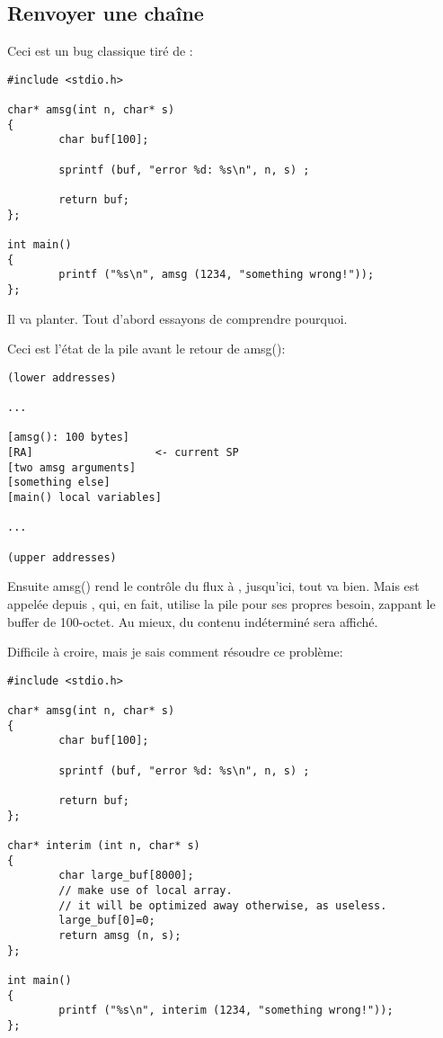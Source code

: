 \subsection{Renvoyer une chaîne}

Ceci est un bug classique tiré de \RobPikePractice{}:

\begin{lstlisting}[style=customc]
#include <stdio.h>

char* amsg(int n, char* s)
{
        char buf[100];

        sprintf (buf, "error %d: %s\n", n, s) ;

        return buf;
};

int main()
{
        printf ("%s\n", amsg (1234, "something wrong!"));
};
\end{lstlisting}

Il va planter.
Tout d'abord essayons de comprendre pourquoi.

Ceci est l'état de la pile avant le retour de amsg():

\begin{lstlisting}
(lower addresses)

...

[amsg(): 100 bytes]
[RA]                   <- current SP
[two amsg arguments]
[something else]
[main() local variables]

...

(upper addresses)
\end{lstlisting}

Ensuite amsg() rend le contrôle du flux à \main, jusqu'ici, tout va bien.
Mais \printf est appelée depuis \main, qui, en fait, utilise la pile pour ses propres
besoin, zappant le buffer de 100-octet.
Au mieux, du contenu indéterminé sera affiché.

Difficile à croire, mais je sais comment résoudre ce problème:

\begin{lstlisting}[style=customc]
#include <stdio.h>

char* amsg(int n, char* s)
{
        char buf[100];

        sprintf (buf, "error %d: %s\n", n, s) ;

        return buf;
};

char* interim (int n, char* s)
{
        char large_buf[8000];
        // make use of local array.
        // it will be optimized away otherwise, as useless.
        large_buf[0]=0;
        return amsg (n, s);
};

int main()
{
        printf ("%s\n", interim (1234, "something wrong!"));
};
\end{lstlisting}

